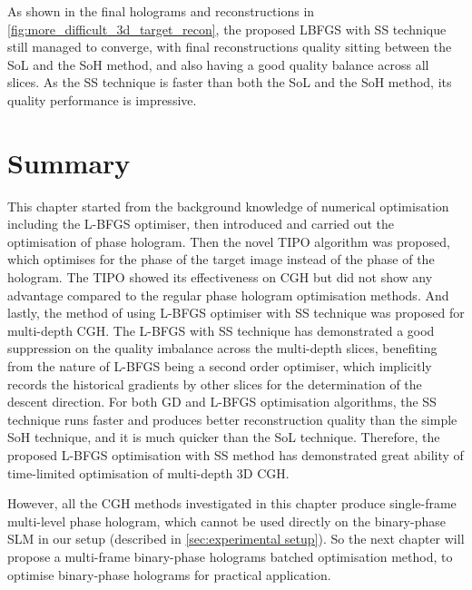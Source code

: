 As shown in the final holograms and reconstructions in \cref{fig:more_difficult_3d_target_recon}, the proposed LBFGS with SS technique still managed to converge, with final reconstructions quality sitting between the SoL and the SoH method, and also having a good quality balance across all slices. As the SS technique is faster than both the SoL and the SoH method, its quality performance is impressive.


\section{Summary}

This chapter started from the background knowledge of numerical optimisation including the L-BFGS optimiser, then introduced and carried out the optimisation of phase hologram. Then the novel TIPO algorithm was proposed, which optimises for the phase of the target image instead of the phase of the hologram. The TIPO showed its effectiveness on CGH but did not show any advantage compared to the regular phase hologram optimisation methods. And lastly, the method of using L-BFGS optimiser with SS technique was proposed for multi-depth CGH. The L-BFGS with SS technique has demonstrated a good suppression on the quality imbalance across the multi-depth slices, benefiting from the nature of L-BFGS being a second order optimiser, which implicitly records the historical gradients by other slices for the determination of the descent direction. For both GD and L-BFGS optimisation algorithms, the SS technique runs faster and produces better reconstruction quality than the simple SoH technique, and it is much quicker than the SoL technique. Therefore, the proposed L-BFGS optimisation with SS method has demonstrated great ability of time-limited optimisation of multi-depth 3D CGH.

However, all the CGH methods investigated in this chapter produce single-frame multi-level phase hologram, which cannot be used directly on the binary-phase SLM in our setup (described in \cref{sec:experimental setup}). So the next chapter will propose a multi-frame binary-phase holograms batched optimisation method, to optimise binary-phase holograms for practical application.